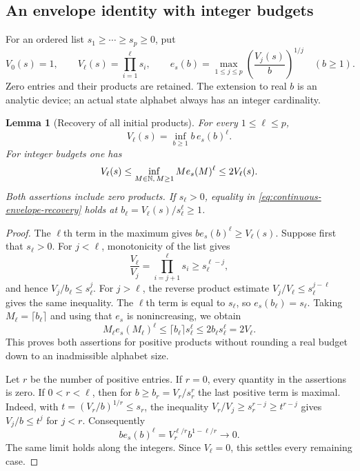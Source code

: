 \documentclass[11pt]{amsart}
\newtheorem{lemma}[theorem]{Lemma}
\theoremstyle{definition}\newtheorem{definition}[theorem]{Definition}
\theoremstyle{remark}\newtheorem{remark}[theorem]{Remark}
\begin{document}
\subsection{An envelope identity with integer budgets}
For an ordered list $s_1\ge\cdots\ge s_p\ge0$, put
\[
 V_0(s)=1,\qquad V_\ell(s)=\prod_{i=1}^{\ell}s_i,
 \qquad
 e_s(b)=\max_{1\le j\le p}\left(\frac{V_j(s)}b\right)^{1/j}
 \quad(b\ge1).
\]
Zero entries and their products are retained. The extension to real
$b$ is an analytic device; an actual state alphabet always has an
integer cardinality.

\begin{lemma}[Recovery of all initial products]
\label{lem:integer-envelope-duality}
For every $1\le\ell\le p$,
\begin{equation}\label{eq:continuous-envelope-recovery}
 V_\ell(s)=\inf_{b\ge1}b\,e_s(b)^\ell.
\end{equation}
For integer budgets one has
\begin{equation}\label{eq:integer-envelope-recovery}
 V_\ell(s)\le
 \inf_{M\in\mathbb N,\,M\ge1}M e_s(M)^\ell
 \le2V_\ell(s).
\end{equation}
Both assertions include zero products. If $s_\ell>0$, equality in
\eqref{eq:continuous-envelope-recovery} holds at
$b_\ell=V_\ell(s)/s_\ell^\ell\ge1$.
\end{lemma}
\begin{proof}
The $\ell$th term in the maximum gives
$b e_s(b)^\ell\ge V_\ell(s)$. Suppose first that $s_\ell>0$.
For $j<\ell$, monotonicity of the list gives
\[
 \frac{V_\ell}{V_j}=\prod_{i=j+1}^{\ell}s_i
       \ge s_\ell^{\ell-j},
\]
and hence $V_j/b_\ell\le s_\ell^j$. For $j>\ell$, the reverse
product estimate $V_j/V_\ell\le s_\ell^{j-\ell}$ gives the same
inequality. The $\ell$th term is equal to $s_\ell$, so
$e_s(b_\ell)=s_\ell$. Taking $M_\ell=\lceil b_\ell\rceil$ and
using that $e_s$ is nonincreasing, we obtain
\[
 M_\ell e_s(M_\ell)^\ell
 \le\lceil b_\ell\rceil s_\ell^\ell
 \le2b_\ell s_\ell^\ell=2V_\ell.
\]
This proves both assertions for positive products without rounding a
real budget down to an inadmissible alphabet size.

Let $r$ be the number of positive entries. If $r=0$, every quantity
in the assertions is zero. If $0<r<\ell$, then for
$b\ge b_r=V_r/s_r^r$ the last positive term is maximal. Indeed,
with $t=(V_r/b)^{1/r}\le s_r$, the inequality
$V_r/V_j\ge s_r^{r-j}\ge t^{r-j}$ gives $V_j/b\le t^j$ for
$j<r$. Consequently
\[
 b e_s(b)^\ell=V_r^{\ell/r}b^{1-\ell/r}\longrightarrow0.
\]
The same limit holds along the integers. Since $V_\ell=0$, this
settles every remaining case.
\end{proof}
\end{document}
